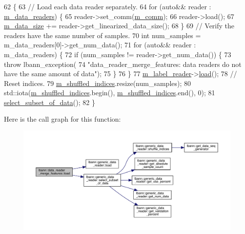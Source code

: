 \begin{DoxyCode}
62                                       \{
63   \textcolor{comment}{// Load each data reader separately.}
64   \textcolor{keywordflow}{for} (\textcolor{keyword}{auto}&& reader : \hyperlink{classlbann_1_1generic__compound__data__reader_a9815e94ade5873415fd766e09d956d5b}{m\_data\_readers}) \{
65     reader->set\_comm(\hyperlink{classlbann_1_1generic__data__reader_ad3976d4b7db2d404dbb87a56c33fd456}{m\_comm});
66     reader->load();
67     \hyperlink{classlbann_1_1data__reader__merge__features_ac9c56e08a45a5beac97e41e403fbaa12}{m\_data\_size} += reader->get\_linearized\_data\_size();
68   \}
69   \textcolor{comment}{// Verify the readers have the same number of samples.}
70   \textcolor{keywordtype}{int} num\_samples = m\_data\_readers[0]->get\_num\_data();
71   \textcolor{keywordflow}{for} (\textcolor{keyword}{auto}&& reader : m\_data\_readers) \{
72     \textcolor{keywordflow}{if} (num\_samples != reader->get\_num\_data()) \{
73       \textcolor{keywordflow}{throw} lbann\_exception(
74         \textcolor{stringliteral}{"data\_reader\_merge\_features: data readers do not have the same amount of data"});
75     \}
76   \}
77   \hyperlink{classlbann_1_1data__reader__merge__features_a1e54a136c63b934f44ff91dc68ea3b27}{m\_label\_reader}->\hyperlink{classlbann_1_1generic__data__reader_afeb47703d988a230a59859cbfc178215}{load}();
78   \textcolor{comment}{// Reset indices.}
79   \hyperlink{classlbann_1_1generic__data__reader_aaab6aeff67ffff1c689336851fec2c57}{m\_shuffled\_indices}.resize(num\_samples);
80   std::iota(\hyperlink{classlbann_1_1generic__data__reader_aaab6aeff67ffff1c689336851fec2c57}{m\_shuffled\_indices}.begin(), \hyperlink{classlbann_1_1generic__data__reader_aaab6aeff67ffff1c689336851fec2c57}{m\_shuffled\_indices}.end(), 0);
81   \hyperlink{classlbann_1_1generic__data__reader_aa28fdeeb6af492540f507e49adff5d6c}{select\_subset\_of\_data}();
82 \}
\end{DoxyCode}
Here is the call graph for this function\+:\nopagebreak
\begin{figure}[H]
\begin{center}
\leavevmode
\includegraphics[width=350pt]{classlbann_1_1data__reader__merge__features_a8a618de9a92cb148746a83b0381ba781_cgraph}
\end{center}
\end{figure}
